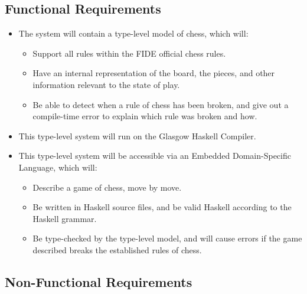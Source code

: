 \documentclass[12pt, a4paper]{scrartcl}
\begin{document}
\subsection{Functional Requirements}

\begin{itemize}
    \item The system will contain a type-level model of chess, which will:
          \begin{itemize}
              \item Support all rules within the FIDE official chess rules.
              \item Have an internal representation of the board, the pieces, and other information relevant to the state of play.
              \item Be able to detect when a rule of chess has been broken, and give out a compile-time error to explain which rule was broken and how.
          \end{itemize}
    \item This type-level system will run on the Glasgow Haskell Compiler.
    \item This type-level system will be accessible via an Embedded Domain-Specific Language, which will:
          \begin{itemize}
              \item Describe a game of chess, move by move.
              \item Be written in Haskell source files, and be valid Haskell according to the Haskell grammar.
              \item Be type-checked by the type-level model, and will cause errors if the game described breaks the established rules of chess.
          \end{itemize}
\end{itemize}

\subsection{Non-Functional Requirements}
\end{document}
